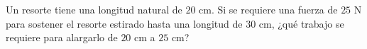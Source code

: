 \item Un resorte tiene una longitud natural de $20 \text{ cm}$. Si se requiere una fuerza de $25 \text{ N}$ para sostener el resorte estirado hasta una longitud de $30 \text{ cm}$, ¿qué trabajo se requiere para alargarlo de $20 \text{ cm}$ a $25 \text{ cm}$?
